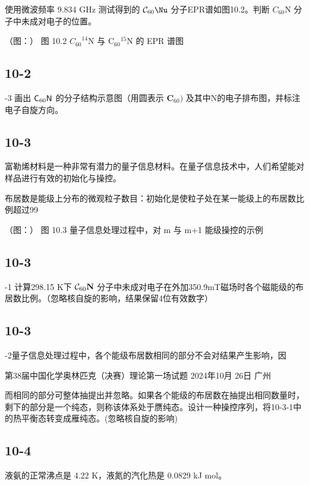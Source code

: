 使用微波频率 9.834 GHz 测试得到的 ${ \cal C } _ { 6 0 } \Nu$ 分子EPR谱如图10.2。判断 $C _ { 6 0 } \mathrm { N }$ 分子中未成对电子的位置。

（图：）
图 10.2 ${ C _ { 6 0 } } ^ { 1 4 } \mathrm { N }$ 与 $\mathrm { C } _ { 6 0 } \mathrm { { } ^ { 1 5 } N }$ 的 EPR 谱图

\subsection*{10-2}
-3 画出 ${ \sf C } _ { 6 0 } { \sf N }$ 的分子结构示意图（用圆表示 $\mathbf { C } _ { 6 0 } )$ 及其中N的电子排布图，并标注电子自旋方向。

\subsection*{10-3}
富勒烯材料是一种非常有潜力的量子信息材料。在量子信息技术中，人们希望能对样品进行有效的初始化与操控。

布居数是能级上分布的微观粒子数目：初始化是使粒子处在某一能级上的布居数比例超过99%

（图：）
图 10.3 量子信息处理过程中，对 m 与 m+1 能级操控的示例

\subsection*{10-3}
-1 计算298.15 K下 ${ \cal C } _ { 6 0 } \mathbf { N }$ 分子中未成对电子在外加350.9mT磁场时各个磁能级的布居数比例。（忽略核自旋的影响，结果保留4位有效数字）

\subsection*{10-3}
-2量子信息处理过程中，各个能级布居数相同的部分不会对结果产生影响，因

第38届中国化学奥林匹克（决赛）理论第一场试题 2024年10月 26日 广州

而相同的部分可整体抽提出并忽略。如果各个能级的布居数在抽提出相同数量时，剩下的部分是一个纯态，则称该体系处于赝纯态。设计一种操控序列，将10-3-1中的热平衡态转变成雁纯态。(忽略核自旋的影响)

\subsection*{10-4}
液氨的正常沸点是 4.22 K，液氮的汽化热是 0.0829 kJ mol。

